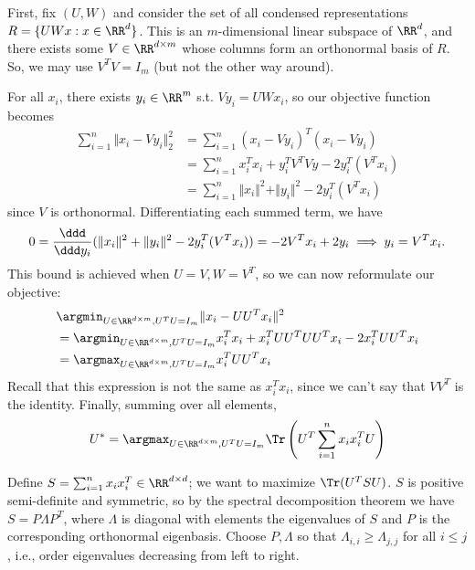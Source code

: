 First, fix $(U,W)$ and consider the set of all condensed representations $R = \{UWx : x\in \RR^d\}$. This is an $m$-dimensional linear subspace of $\RR^d$, and there exists some $V\in \RR^{d\times m}$ whose columns form an orthonormal basis of $R$. So, we may use $V^TV=I_m$ (but not the other way around). 

For all $x_i$, there exists $y_i\in \RR^m$ s.t. $Vy_i = UWx_i$, so our objective function becomes
\begin{align*}
	\sum_{i=1}^n \Vert x_i - Vy_i\Vert_2^2 &= \sum_{i=1}^n (x_i-Vy_i)^T(x_i-Vy_i) \\
																				 &= \sum_{i=1}^n x_i^Tx_i + y_i^TV^TVy - 2y_i^T(V^Tx_i) \\
																				 &= \sum_{i=1}^n \Vert x_i\Vert^2 + \Vert y_i\Vert^2 - 2y_i^T(V^Tx_i)
\end{align*}
since $V$ is orthonormal. Differentiating each summed term, we have 
\[0 = \frac{\ddd}{\ddd y_i}(\Vert x_i\Vert^2 + \Vert y_i\Vert^2 - 2y_i^T(V^Tx_i)) = -2V^Tx_i + 2y_i \implies y_i = V^Tx_i.\]
This bound is achieved when $U=V,W=V^T$, so we can now reformulate our objective: 
\begin{align*}
	&\argmin_{U\in \RR^{d\times m}, U^TU=I_m}\Vert x_i - UU^Tx_i\Vert^2 \\
			&= \argmin_{U\in \RR^{d\times m}, U^TU=I_m}x_i^Tx_i + x_i^TUU^TUU^Tx_i - 2x_i^TUU^Tx_i \\
			&= \argmax_{U\in \RR^{d\times m}, U^TU=I_m} x_i^TUU^Tx_i
\end{align*}
Recall that this expression is not the same as $x_i^Tx_i$, since we can't say that $VV^T$ is the identity. Finally, summing over all elements, 
\[U^* = \argmax_{U\in \RR^{d\times m}, U^TU=I_m} \Tr\left(U^T\sum_{i=1}^n x_ix_i^T U\right)\] 

Define $S=\sum_{i=1}^nx_ix_i^T\in \RR^{d\times d}$; we want to maximize $\Tr(U^TSU)$. $S$ is positive semi-definite and symmetric, so by the spectral decomposition theorem we have $S=P \Lambda P^T$, where $\Lambda$ is diagonal with elements the eigenvalues of $S$ and $P$ is the corresponding orthonormal eigenbasis. Choose $P,\Lambda$ so that $\Lambda_{i,i}\geq \Lambda_{j,j}$ for all $i\leq j$, i.e., order eigenvalues decreasing from left to right. 

